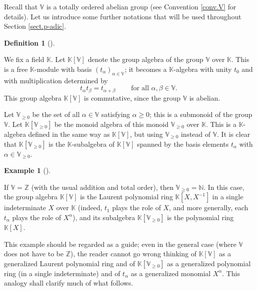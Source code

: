 \documentclass[numbers=enddot,12pt,final,onecolumn,notitlepage]{scrartcl}%
\theoremstyle{definition}
\newtheorem{defi}[theo]{Definition}
\newenvironment{definition}[1][]
{\begin{defi}[#1]\begin{leftbar}}
{\end{leftbar}\end{defi}}
\newtheorem{exam}[theo]{Example}
\newenvironment{example}[1][]
{\begin{exam}[#1]\begin{leftbar}}
{\end{leftbar}\end{exam}}
\renewcommand{\geq}{\geqslant}
\theoremstyle{plainsl}
\begin{document}
Recall that $\mathbb{V}$ is a totally ordered abelian group (see Convention
\ref{conv.V} for details). Let us introduce some further notations that will
be used throughout Section \ref{sect.p-adic}.

\begin{definition}
We fix a field $\mathbb{K}$. Let $\mathbb{K}\left[  \mathbb{V}\right]  $
denote the group algebra of the group $\mathbb{V}$ over $\mathbb{K}$. This is
a free $\mathbb{K}$-module with basis $\left(  t_{\alpha}\right)  _{\alpha
\in\mathbb{V}}$; it becomes a $\mathbb{K}$-algebra with unity $t_{0}$ and with
multiplication determined by%
\[
t_{\alpha}t_{\beta}=t_{\alpha+\beta}\ \ \ \ \ \ \ \ \ \ \text{for all }%
\alpha,\beta\in\mathbb{V}.
\]
This group algebra $\mathbb{K}\left[  \mathbb{V}\right]  $ is commutative,
since the group $\mathbb{V}$ is abelian.

Let $\mathbb{V}_{\geq0}$ be the set of all $\alpha\in\mathbb{V}$ satisfying
$\alpha\geq0$; this is a submonoid of the group $\mathbb{V}$. Let
$\mathbb{K}\left[  \mathbb{V}_{\geq0}\right]  $ be the monoid algebra of this
monoid $\mathbb{V}_{\geq0}$ over $\mathbb{K}$. This is a $\mathbb{K}$-algebra
defined in the same way as $\mathbb{K}\left[  \mathbb{V}\right]  $, but using
$\mathbb{V}_{\geq0}$ instead of $\mathbb{V}$. It is clear that $\mathbb{K}%
\left[  \mathbb{V}_{\geq0}\right]  $ is the $\mathbb{K}$-subalgebra of
$\mathbb{K}\left[  \mathbb{V}\right]  $ spanned by the basis elements
$t_{\alpha}$ with $\alpha\in\mathbb{V}_{\geq0}$.
\end{definition}

\begin{example}
\label{exa.ord.V=Z}If $\mathbb{V}=\mathbb{Z}$ (with the usual addition and
total order), then $\mathbb{V}_{\geq0}=\mathbb{N}$. In this case, the group
algebra $\mathbb{K}\left[  \mathbb{V}\right]  $ is the Laurent polynomial ring
$\mathbb{K}\left[  X,X^{-1}\right]  $ in a single indeterminate $X$ over
$\mathbb{K}$ (indeed, $t_{1}$ plays the role of $X$, and more generally, each
$t_{\alpha}$ plays the role of $X^{\alpha}$), and its subalgebra
$\mathbb{K}\left[  \mathbb{V}_{\geq0}\right]  $ is the polynomial ring
$\mathbb{K}\left[  X\right]  $.
\end{example}

This example should be regarded as a guide; even in the general case (where
$\mathbb{V}$ does not have to be $\mathbb{Z}$), the reader cannot go wrong
thinking of $\mathbb{K}\left[  \mathbb{V}\right]  $ as a generalized Laurent
polynomial ring and of $\mathbb{K}\left[  \mathbb{V}_{\geq0}\right]  $ as a
generalized polynomial ring (in a single indeterminate) and of $t_{\alpha}$ as
a generalized monomial $X^{\alpha}$. This analogy shall clarify much of what follows.
\end{document}
